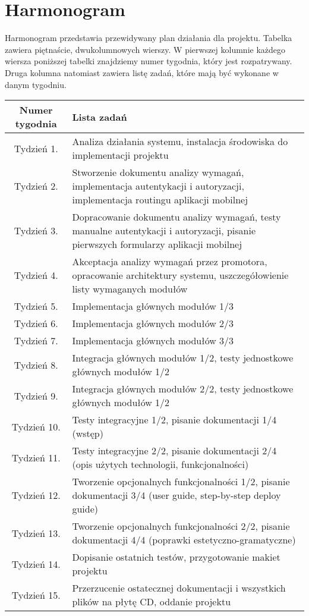 \documentclass{article}
\begin{document}
\section{Harmonogram}

Harmonogram przedstawia przewidywany plan działania dla projektu. Tabelka zawiera piętnaście, dwukolumnowych wierszy. W pierwszej kolumnie każdego wiersza poniższej tabelki znajdziemy numer tygodnia, który jest rozpatrywany. Druga kolumna natomiast zawiera listę zadań, które mają być wykonane w danym tygodniu.

\begin{center}
	\begin{tabular}{|c|L|}
	\hline
	Numer tygodnia & Lista zadań \\
	\hline
	Tydzień 1. & Analiza działania systemu, instalacja środowiska do implementacji projektu\\
	\hline
	Tydzień 2. & Stworzenie dokumentu analizy wymagań, implementacja autentykacji i autoryzacji, implementacja routingu aplikacji mobilnej\\
	\hline
	Tydzień 3. & Dopracowanie dokumentu analizy wymagań, testy manualne autentykacji i autoryzacji, pisanie pierwszych formularzy aplikacji mobilnej\\
	\hline
	Tydzień 4. & Akceptacja analizy wymagań przez promotora, opracowanie architektury systemu, uszczegółowienie listy wymaganych modułów \\
	\hline
	Tydzień 5. & Implementacja głównych modułów 1/3 \\
	\hline
	Tydzień 6. & Implementacja głównych modułów 2/3 \\
	\hline
	Tydzień 7. & Implementacja głównych modułów 3/3 \\
	\hline
	Tydzień 8. & Integracja głównych modułów 1/2, testy jednostkowe głównych modułów 1/2 \\
	\hline
	Tydzień 9. & Integracja głównych modułów 2/2, testy jednostkowe głównych modułów 1/2 \\
	\hline
	Tydzień 10. & Testy integracyjne 1/2, pisanie dokumentacji 1/4 (wstęp) \\
	\hline
	Tydzień 11. & Testy integracyjne 2/2, pisanie dokumentacji 2/4 (opis użytych technologii, funkcjonalności) \\
	\hline
	Tydzień 12. & Tworzenie opcjonalnych funkcjonalności 1/2, pisanie dokumentacji 3/4 (user guide, step-by-step deploy guide) \\
	\hline
	Tydzień 13. & Tworzenie opcjonalnych funkcjonalności 2/2, pisanie dokumentacji 4/4 (poprawki estetyczno-gramatyczne) \\
	\hline
	Tydzień 14. & Dopisanie ostatnich testów, przygotowanie makiet projektu \\
	\hline
	Tydzień 15. & Przerzucenie ostatecznej dokumentacji i wszystkich plików na płytę CD, oddanie projektu \\
	\hline
	\end{tabular}
\end{center}
\end{document}
